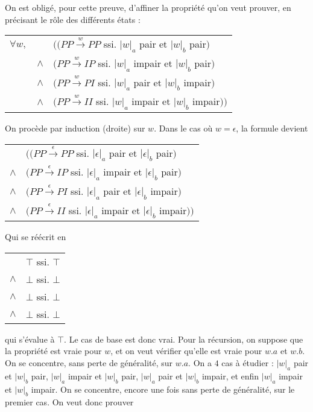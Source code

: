 \begin{correction*}
On est obligé, pour cette preuve, d'affiner la propriété qu'on veut prouver, en précisant le rôle des différents états :\\
\begin{tabular}{crl}
$\forall w,$& & $((PP \xrightarrow{w} PP$ ssi. $|w|_a $ pair et $|w|_b$ pair$)$ \\

&$\wedge$& $(PP \xrightarrow{w} IP$ ssi. $|w|_a $ impair et $|w|_b$ pair$)$ \\

&$\wedge$& $(PP \xrightarrow{w} PI$ ssi. $|w|_a $ pair et $|w|_b$ impair$)$ \\

&$\wedge$& $(PP \xrightarrow{w} II$ ssi. $|w|_a $ impair et $|w|_b$ impair$))$ 

\end{tabular}

On procède par induction (droite) sur $w$. Dans le cas où $w = \epsilon$, la formule devient \\

\begin{tabular}{rl}
& $((PP \xrightarrow{\epsilon} PP$ ssi. $|\epsilon|_a $ pair et $|\epsilon|_b$ pair$)$ \\

$\wedge$& $(PP \xrightarrow{\epsilon} IP$ ssi. $|\epsilon|_a $ impair et $|\epsilon|_b$ pair$)$ \\

$\wedge$& $(PP \xrightarrow{\epsilon} PI$ ssi. $|\epsilon|_a $ pair et $|\epsilon|_b$ impair$)$ \\

$\wedge$& $(PP \xrightarrow{\epsilon} II$ ssi. $|\epsilon|_a $ impair et $|\epsilon|_b$ impair$))$ 
\end{tabular}

Qui se réécrit en \\

\begin{tabular}{rl}
& $\top$ ssi. $\top$ \\

$\wedge$& $\bot$ ssi. $\bot$ \\

$\wedge$& $\bot$ ssi. $\bot$ \\

$\wedge$& $\bot$ ssi. $\bot$
\end{tabular}

qui s'évalue à $\top$. Le cas de base est donc vrai. Pour la récursion, on suppose que la propriété est vraie pour $w$, et on veut vérifier qu'elle est vraie pour $w.a$ et $w.b$. On se concentre, sans perte de généralité, sur $w.a$. On a $4$ cas à étudier : $|w|_a$ pair et $|w|_b$ pair, $|w|_a$ impair et $|w|_b$ pair, $|w|_a$ pair et $|w|_b$ impair, et enfin $|w|_a$ impair et $|w|_b$ impair. On se concentre, encore une fois sans perte de généralité, sur le premier cas. On veut donc prouver \\


\end{correction*}

